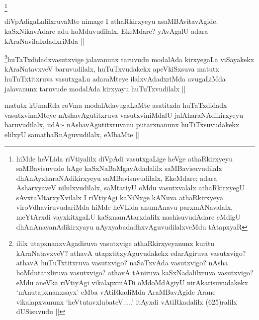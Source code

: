 \begin{artha}
\footnote{hiMde heVLida riVtiyalilx diVpAdi vasutxgaLige heVge athaRkirxyeyu saMBavisuvudo hAge kaSxNaBaMgavAdadalilx saMBavisuvudilalx dhAnAyxharaNAdikirxyeyu saMBavisuvudilalx, EkeMdare; adara AsharxyaveV nilulxvudilalx, saMtatiyU oMdu vasutxvalalx athaRkirxyegU sAvxtaMtarxyXvilalx I riVtiyAgi kaNiNxge kANuva athaRkirxyeya viroVdhaviruvudariMda hiMde heVLida anumAnavu parxmANavalalx, meYtArxdi vayxkitxgaLU kaSxnamAtarxdalilx nashisuvudAdare eMdigU dhAnAnayanAdikirxyayu nAyxyabadadhxvAguvudilalxveMdu tAtapxyaR}
\end{artha}

\begin{artha}
diVpAdigaLalilxruvaMte nimage I athaRkirxyeyu asaMBAvitavAgide. kaSxNikavAdare adu hoMduvudilalx, EkeMdare? yAvAgalU adara kAraNavilalxdadxriMda ||
\end{artha}

\begin{artha}
\footnote{ililx utapxnanxvAgadiruva vasutxvige athaRkirxyeyanunx kuritu kAraNatavxveV? athavA utapxtitxyAguvudakekx edarAgiruva vasutxvigo? athavA huTuTxtitxruva vasutxvigo? naSaTxvAda vasutxvigo? nAsha hoMdutatxliruva vasutxvigo? athavA tAniruva kaSxNadalilxruva vasutxvigo? eMdu aneVka riVtiyAgi vikalapxmADi oMdoMdAgiyU nirAkarisuvudakekx `nAnutapxnanxsayx' eMba vAtiRkadiMda AraMBavAgide Arane vikalapxvanunx `heVtutavxlubateV.....' itAyxdi vAtiRkadalilx (625)ralilx dUSisuvudu ||}huTaTxdidadxvasutxvige jalavanunx taruvudu modalAda kirxyegaLa viSayakekx kAraNatavxveV baruvudilalx, huTuTxvudakekx apeVkiSxsuva matutx huTuTxtitxruva vasutxgaLu adaraMteye ilalxvAdadxriMda avugaLiMda jalavanunx taruvude modalAda kirxyayu huTuTxvudilalx ||
\end{artha}

\begin{artha}
matutx kUmaRda roVma modalAdavugaLaMte asatitxda huTaTxdidadx vasutxvinaMteye  nAshavAgutitxruva vasutxviniMdalU jalAharaNAdikirxyeyu baruvudilalx, udA:- nAshavAgutitxruvanu putarxnanunx huTiTxsuvudakekx elilxyU samathaRnAguvudilalx, eMbaMte ||
\end{artha}


